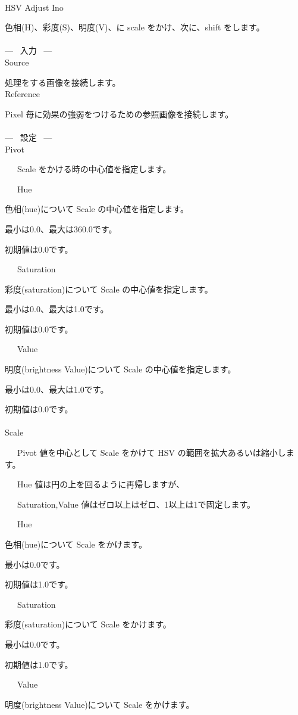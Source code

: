 \documentclass[a4paper,12pt]{article}
\begin{document}
\thispagestyle{empty}

\Large
\noindent \\
HSV Adjust Ino\medskip
\par
\normalsize
色相(H)、彩度(S)、明度(V)、に scale をかけ、次に、shift をします。\\
\\
--- \ 入力 \ ---\\
Source\par
処理をする画像を接続します。\\
Reference\par
Pixel 毎に効果の強弱をつけるための参照画像を接続します。\\
\\
--- \ 設定 \ ---\\
Pivot\par
\noindent \ \ \, Scale をかける時の中心値を指定します。\\
\par
\noindent \ \ \, Hue\par
色相(hue)について Scale の中心値を指定します。\par
最小は0.0、最大は360.0です。\par
初期値は0.0です。\par
\noindent \ \ \, Saturation\par
彩度(saturation)について Scale の中心値を指定します。\par
最小は0.0、最大は1.0です。\par
初期値は0.0です。\par
\noindent \ \ \, Value\par
明度(brightness Value)について Scale の中心値を指定します。\par
最小は0.0、最大は1.0です。\par
初期値は0.0です。\\
\\
Scale\par
\noindent \ \ \, Pivot 値を中心として Scale をかけて HSV の範囲を拡大あるいは縮小します。\par
\noindent \ \ \, Hue 値は円の上を回るように再帰しますが、\par
\noindent \ \ \, Saturation,Value 値はゼロ以上はゼロ、1以上は1で固定します。\\
\par
\noindent \ \ \, Hue\par
色相(hue)について Scale をかけます。\par
最小は0.0です。\par
初期値は1.0です。\par
\noindent \ \ \, Saturation\par
彩度(saturation)について Scale をかけます。\par
最小は0.0です。\par
初期値は1.0です。\par
\noindent \ \ \, Value\par
明度(brightness Value)について Scale をかけます。
\end{document}
